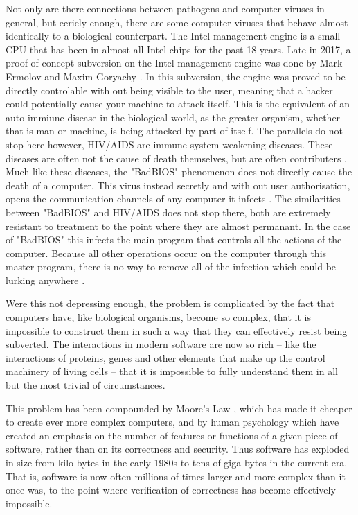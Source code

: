 Not only are there connections between pathogens and computer viruses in general, but eeriely enough, there are some computer viruses that behave almost identically to a biological counterpart. 
The Intel management engine is a small CPU that has been in almost all Intel chips for the past 18 years. 
Late in 2017, a proof of concept subversion on the Intel management engine was done by Mark Ermolov and Maxim Goryachy \cite{Hackaday}. In this subversion, the engine was proved to be directly controlable with out being visible to the user, meaning that a hacker could potentially cause your machine to attack itself. 
This is the equivalent of an auto-immiune disease in the biological world, as the greater organism, whether that is man or machine, is being attacked by part of itself. 
The parallels do not stop here however, HIV/AIDS are immune system weakening diseases. 
These diseases are often not the cause of death themselves, but are often contributers \cite{ggHIV}. 
Much like these diseases, the "BadBIOS" phenomenon does not directly cause the death of a computer. 
This virus instead secretly and with out user authorisation, opens the communication channels of any computer it infects \cite{Reference5}. 
The similarities between "BadBIOS" and HIV/AIDS does not stop there, both are extremely resistant to treatment to the point where they are almost permanant. 
In the case of "BadBIOS" this infects the main program that controls all the actions of the computer. 
Because all other operations occur on the computer through this master program, there is no way to remove all of the infection which could be lurking anywhere \cite{Reference5}.

Were this not depressing enough, the problem is complicated by the fact that computers have, like biological organisms,
become so complex, that it is impossible to construct them in such a way that they can effectively resist being subverted.
The interactions in modern software are now so rich -- like the interactions of proteins, genes and other elements that make up
the control machinery of living cells -- that it is impossible to fully understand them in all but the most trivial of circumstances.

This problem has been compounded by Moore's Law \cite{Moore}, which has made it cheaper to create ever more complex computers, and
by human psychology which have created an emphasis on the number of features or functions of a given piece of software, rather than
on its correctness and security.  
Thus software has exploded in size from kilo-bytes in the early 1980s to tens of giga-bytes in the current era. 
That is, software is now often millions of times larger and more complex than it once was, to the point where verification of correctness has become effectively impossible.

